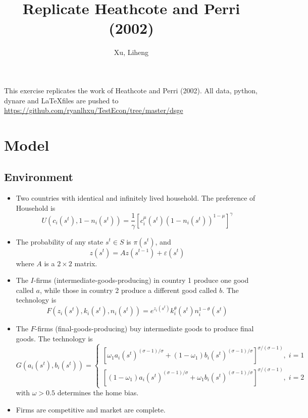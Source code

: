 \documentclass[11pt,a4paper]{article}
\title{Replicate Heathcote and Perri (2002)}
\author{Xu, Liheng}
\date{}
\begin{document}
\maketitle
This exercise replicates the work of Heathcote and Perri (2002). All data, python, dynare and \LaTeX \;files are pushed to \url{https://github.com/ryanlhxu/TestEcon/tree/master/dsge}
\section{Model}
\subsection{Environment}

\begin{itemize}
	\item Two countries with identical and infinitely lived household. The preference of Household is
	    \begin{equation}
	        U(c_i(s^t),1-n_i(s^t))=\frac{1}{\gamma}{[c_i^\mu(s^t){(1-n_i(s^t))}^{1-\mu}]}^\gamma
	    \end{equation}
	    
	\item The probability of any state $s^t \in S$ is $\pi(s^t)$, and
            \begin{equation}
               z(s^t)=Az(s^{t-1})+\varepsilon(s^t)
            \end{equation}
    where $A$ is a $2\times2$ matrix.
    \item The $I$-firms (intermediate-goods-producing) in country 1 produce one good called $a$, while those in country 2 produce a different good called $b$. The technology is
        \begin{equation}
            F(z_i(s^t),k_i(s^t),n_i(s^t))=e^{z_i(s^t)}k_i^\theta(s^t)n_i^{1-\theta}(s^t)
        \end{equation}
    \item The $F$-firms (final-goods-producing) buy intermediate goods to produce final goods. The technology is
        \begin{equation}
        G(a_i(s^t),b_i(s^t))=\left\{   
        \begin{array}{ll}
        	{[{\omega_1a_i(s^t)}^{(\sigma-1)/\sigma}+{(1-\omega_1)b_i(s^t)}^{(\sigma-1)/\sigma}   ]}^{\sigma/(\sigma-1)},\; i=1\\
        	{[{(1-\omega_1)a_i(s^t)}^{(\sigma-1)/\sigma}+{\omega_1b_i(s^t)}^{(\sigma-1)/\sigma}   ]}^{\sigma/(\sigma-1)},\; i=2
        \end{array}
         \right.
        \end{equation}
        with $\omega>0.5$ determines the home bias.
    \item Firms are competitive and market are complete.
	
\end{itemize}
\end{document}
